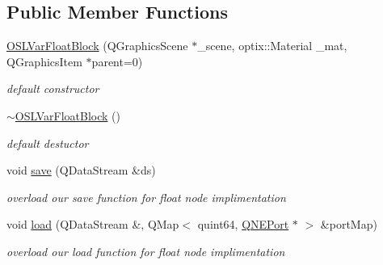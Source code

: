 \subsection*{Public Member Functions}
\begin{DoxyCompactItemize}
\item 
\hypertarget{class_o_s_l_var_float_block_a03a827e44bb26be99581d7aff5e57398}{\hyperlink{class_o_s_l_var_float_block_a03a827e44bb26be99581d7aff5e57398}{O\-S\-L\-Var\-Float\-Block} (Q\-Graphics\-Scene $\ast$\-\_\-scene, optix\-::\-Material \-\_\-mat, Q\-Graphics\-Item $\ast$parent=0)}\label{class_o_s_l_var_float_block_a03a827e44bb26be99581d7aff5e57398}

\begin{DoxyCompactList}\small\item\em default constructor \end{DoxyCompactList}\item 
\hypertarget{class_o_s_l_var_float_block_a712a36ae5a5d1c2d5f2eff8685439230}{\hyperlink{class_o_s_l_var_float_block_a712a36ae5a5d1c2d5f2eff8685439230}{$\sim$\-O\-S\-L\-Var\-Float\-Block} ()}\label{class_o_s_l_var_float_block_a712a36ae5a5d1c2d5f2eff8685439230}

\begin{DoxyCompactList}\small\item\em default destuctor \end{DoxyCompactList}\item 
\hypertarget{class_o_s_l_var_float_block_a036d338b7ca38fbd20daa2b22123f94f}{void \hyperlink{class_o_s_l_var_float_block_a036d338b7ca38fbd20daa2b22123f94f}{save} (Q\-Data\-Stream \&ds)}\label{class_o_s_l_var_float_block_a036d338b7ca38fbd20daa2b22123f94f}

\begin{DoxyCompactList}\small\item\em overload our save function for float node implimentation \end{DoxyCompactList}\item 
\hypertarget{class_o_s_l_var_float_block_ac0a7985ab09570956941088e53ad5956}{void \hyperlink{class_o_s_l_var_float_block_ac0a7985ab09570956941088e53ad5956}{load} (Q\-Data\-Stream \&, Q\-Map$<$ quint64, \hyperlink{class_q_n_e_port}{Q\-N\-E\-Port} $\ast$ $>$ \&port\-Map)}\label{class_o_s_l_var_float_block_ac0a7985ab09570956941088e53ad5956}

\begin{DoxyCompactList}\small\item\em overload our load function for float node implimentation \end{DoxyCompactList}\end{DoxyCompactItemize}
